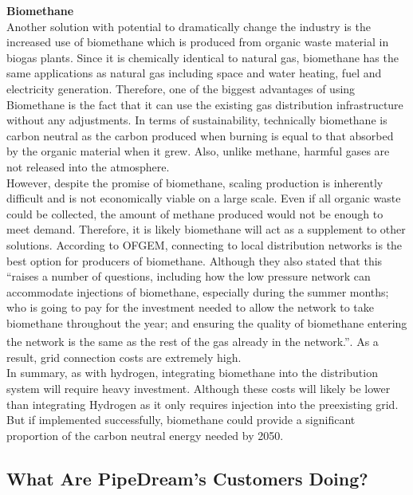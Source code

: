 \documentclass[11pt]{article}		%
\newcommand{\supercite}[1]{\textsuperscript{\cite{#1}}}		%
\begin{document}
            \textbf{Biomethane} \\
            Another solution with potential to dramatically change the industry is the increased use of biomethane which is produced from organic waste material in biogas plants. Since it is chemically identical to natural gas, biomethane has the same applications as natural gas including space and water heating, fuel and electricity generation. Therefore, one of the biggest advantages of using Biomethane is the fact that it can use the existing gas distribution infrastructure without any adjustments. In terms of sustainability, technically biomethane is carbon neutral as the carbon produced when burning is equal to that absorbed by the organic material when it grew. Also, unlike methane, harmful gases are not released into the atmosphere.\\
    	    \hspace*{3ex}However, despite the promise of biomethane, scaling production is inherently difficult and is not economically viable on a large scale. Even if all organic waste could be collected, the amount of methane produced would not be enough to meet demand. Therefore, it is likely biomethane will act as a supplement to other solutions. According to OFGEM, connecting to local distribution networks is the best option for producers of biomethane. Although they also stated that this “raises a number of questions, including how the low pressure network can accommodate injections of biomethane, especially during the summer months; who is going to pay for the investment needed to allow the network to take biomethane throughout the year; and ensuring the quality of biomethane entering the network is the same as the rest of the gas already in the network.”\supercite{biomethaneof}. As a result, grid connection costs are extremely high.\\
        	\hspace*{3ex}In summary, as with hydrogen, integrating biomethane into the distribution system will require heavy investment. Although these costs will likely be lower than integrating Hydrogen as it only requires injection into the preexisting grid. But if implemented successfully, biomethane could provide a significant proportion of the carbon neutral energy needed by 2050.
    
    		\subsection[What Are PipeDream's Customers Doing?]{What Are PipeDream's Customers Doing?}
    		
\end{document}
